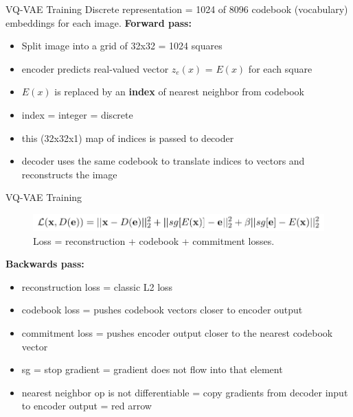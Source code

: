 \documentclass{beamer}
\begin{document}
\begin{frame}{VQ-VAE Training}
Discrete representation = 1024 of 8096 codebook (vocabulary) embeddings for each image.
\vfill
\textbf{Forward pass:}
\begin{itemize}
\item Split image into a grid of 32x32 = 1024 squares
\item encoder predicts real-valued vector $z_e(x)$ = $E(x)$ for each square
\item $E(x)$ is replaced by an \textbf{index} of nearest neighbor from codebook
\item index = integer = discrete
\item this (32x32x1) map of indices is passed to decoder
\item decoder uses the same codebook to translate indices to vectors and reconstructs the image
\end{itemize}

\end{frame}
\begin{frame}{VQ-VAE Training}

\begin{figure}[h]
\includegraphics[width=\textwidth]{img/loss}
\caption{Loss = reconstruction + codebook + commitment losses.}
\end{figure}

\textbf{Backwards pass:}
\begin{itemize}
\item reconstruction loss = classic L2 loss
\item codebook loss = pushes codebook vectors closer to encoder output
\item commitment loss = pushes encoder output closer to the nearest codebook vector
\item sg = stop gradient = gradient does not flow into that element
\item nearest neighbor op is not differentiable = copy gradients from decoder input to encoder output = red arrow
\end{itemize}

\end{frame}
\end{document}
